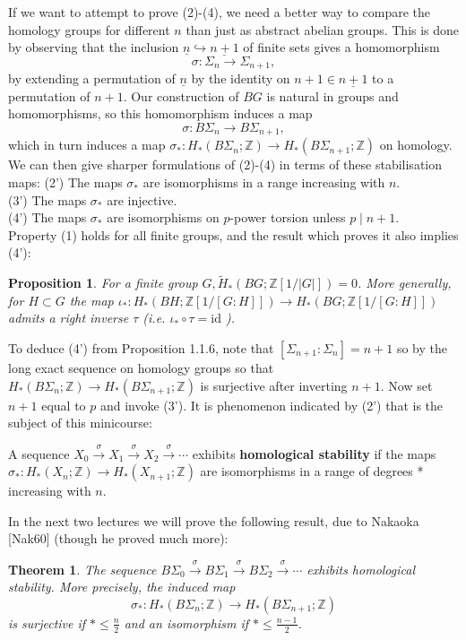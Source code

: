 \documentclass{book}
\newtheorem{theo}{Theorem}
\newtheorem{prop}{Proposition}
\begin{document}
If we want to attempt to prove (2)-(4), we need a better way to compare the homology groups for different $n$ than just as abstract abelian groups. This is done by observing that the inclusion $\underline{n} \hookrightarrow \underline{n+1}$ of finite sets gives a homomorphism
$$
\sigma: \Sigma_n \longrightarrow \Sigma_{n+1},
$$
by extending a permutation of $\underline{n}$ by the identity on $n+1 \in \underline{n+1}$ to a permutation of $n+1$. Our construction of $B G$ is natural in groups and homomorphisms, so this homomorphism induces a map
$$
\sigma: B \Sigma_n \longrightarrow B \Sigma_{n+1},
$$
which in turn induces a map $\sigma_*: H_*\left(B \Sigma_n ; \mathbb{Z}\right) \rightarrow H_*\left(B \Sigma_{n+1} ; \mathbb{Z}\right)$ on homology. We can then give sharper formulations of (2)-(4) in terms of these stabilisation maps:
(2') The maps $\sigma_*$ are isomorphisms in a range increasing with $n$.\\
(3') The maps $\sigma_*$ are injective.\\
(4') The maps $\sigma_*$ are isomorphisms on $p$-power torsion unless $p \mid n+1$.\\
Property (1) holds for all finite groups, and the result which proves it also implies (4'):

\begin{prop}
For a finite group $G, \widetilde{H}_*(B G ; \mathbb{Z}[1 /|G|])=0$. More generally, for $H \subset G$ the map $\iota_*: H_*(B H ; \mathbb{Z}[1 /[G: H]]) \rightarrow H_*(B G ; \mathbb{Z}[1 /[G: H]])$ admits a right inverse $\tau$ (i.e. $\iota_* \circ \tau=\mathrm{id}$ ).
\end{prop}

To deduce (4') from Proposition 1.1.6, note that $\left[\Sigma_{n+1}: \Sigma_n\right]=n+1$ so by the long exact sequence on homology groups so that $H_*\left(B \Sigma_n ; \mathbb{Z}\right) \rightarrow H_*\left(B \Sigma_{n+1} ; \mathbb{Z}\right)$ is surjective after inverting $n+1$. Now set $n+1$ equal to $p$ and invoke (3').
It is phenomenon indicated by (2') that is the subject of this minicourse:

A sequence $X_0 \xrightarrow{\sigma} X_1 \xrightarrow{\sigma} X_2 \xrightarrow{\sigma} \cdots$ exhibits \textbf{homological stability} if the maps $\sigma_*: H_*\left(X_n ; \mathbb{Z}\right) \rightarrow H_*\left(X_{n+1} ; \mathbb{Z}\right)$ are isomorphisms in a range of degrees * increasing with $n$.

In the next two lectures we will prove the following result, due to Nakaoka [Nak60] (though he proved much more):
\begin{theo}
The sequence $B \Sigma_0 \xrightarrow{\sigma} B \Sigma_1 \xrightarrow{\sigma} B \Sigma_2 \xrightarrow{\sigma} \cdots$ exhibits homological stability. More precisely, the induced map
    $$
    \sigma_*: H_*\left(B \Sigma_n ; \mathbb{Z}\right) \longrightarrow H_*\left(B \Sigma_{n+1} ; \mathbb{Z}\right)
    $$
    is surjective if $* \leq \frac{n}{2}$ and an isomorphism if $* \leq \frac{n-1}{2}$.
\end{theo}
\end{document}

